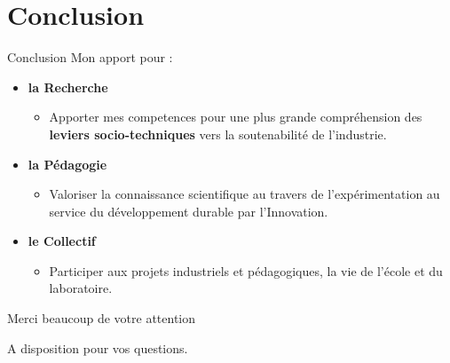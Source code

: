 \documentclass[
  11pt,
  ignorenonframetext,
  aspectratio=169,
  c]{beamer}
\providecommand{\tightlist}{%
  \setlength{\itemsep}{0pt}\setlength{\parskip}{0pt}}\usepackage{longtable,booktabs,array}
\begin{document}
\hypertarget{conclusion}{%
\section{Conclusion}\label{conclusion}}

\begin{frame}{Conclusion}
Mon apport pour :

\begin{itemize}
\item
  \textbf{la Recherche}

  \begin{itemize}
  \tightlist
  \item
    Apporter mes competences pour une plus grande compréhension des
    \textbf{leviers socio-techniques} vers la soutenabilité de
    l'industrie.
  \end{itemize}
\item
  \textbf{la Pédagogie}

  \begin{itemize}
  \tightlist
  \item
    Valoriser la connaissance scientifique au travers de
    l'expérimentation au service du développement durable par
    l'Innovation.
  \end{itemize}
\item
  \textbf{le Collectif}

  \begin{itemize}
  \tightlist
  \item
    Participer aux projets industriels et pédagogiques, la vie de
    l'école et du laboratoire.
  \end{itemize}
\end{itemize}
\end{frame}

\begin{frame}{Merci beaucoup de votre attention}
\protect\hypertarget{merci-beaucoup-de-votre-attention}{}
\begin{block}{A disposition pour vos questions.}
\protect\hypertarget{a-disposition-pour-vos-questions.}{}
\end{block}
\end{frame}
\end{document}

